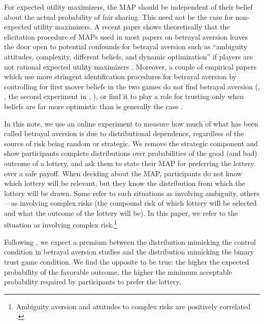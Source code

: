 For expected utility maximizers, the MAP should be independent of their belief about the actual probability of fair sharing.
This need not be the case for non-expected utility maximizers.
A recent paper shows theoretically that the elicitation procedure of MAPs used in most papers on betrayal aversion leaves the door open to potential confounds for betrayal aversion such as ``ambiguity attitudes, complexity, different beliefs, and dynamic optimization'' if players are not rational expected utility maximizers \citep{Li2020a}.
Moreover, a couple of empirical papers which use more stringent identification procedures for betrayal aversion by controlling for first mover beliefs in the two games do not find betrayal aversion (\citeauthor{Fetchenhauer2012}, \citeyear{Fetchenhauer2012}, the second experiment in \citeauthor{Polipciuc2022inout}, \citeyear{Polipciuc2022inout}), or find it to play a role for trusting only when beliefs are far more optimistic than is generally the case \citep{Engelmann2021}.

In this note, we use an online experiment to measure how much of what has been called betrayal aversion is due to distributional dependence, regardless of the source of risk being random or strategic.
We remove the strategic component and show participants complete distributions over probabilities of the good (and bad) outcome of a lottery, and ask them to state their MAP for preferring the lottery over a safe payoff.
When deciding about the MAP, participants do not know which lottery will be relevant, but they know the distribution from which the lottery will be drawn.
Some refer to such situations as involving ambiguity, others---as involving complex risks (the compound risk of which lottery will be selected and what the outcome of the lottery will be).
In this paper, we refer to the situation as involving complex risk.\footnote{
Ambiguity aversion and attitudes to complex risks are positively correlated \citep{Armantier2016}.
}

Following \cite{Li2020a}, we expect a premium between the distribution mimicking the control condition in betrayal aversion studies and the distribution mimicking the binary trust game condition.
We find the opposite to be true: the higher the expected probability of the favorable outcome, the higher the minimum acceptable probability required by participants to prefer the lottery.

